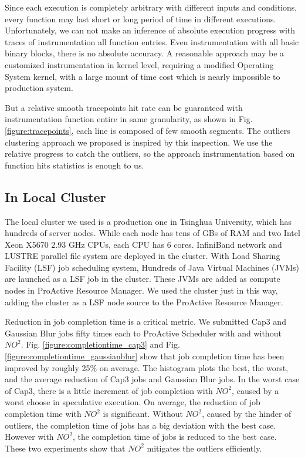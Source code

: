 Since each execution is completely arbitrary with different inputs and conditions, every
function may last short or long period of time in different executions. Unfortunately, we can
not make an inference of absolute execution progress with traces of instrumentation all
function entries. Even instrumentation with all basic binary blocks, there is no absolute
accuracy. A reasonable approach may be a customized instrumentation in kernel level,
requiring a modified Operating System kernel, with a large mount of time cost which is
nearly impossible to production system.

But a relative smooth tracepoints hit rate can be guaranteed with instrumentation function
entire in same granularity, as shown in Fig. \ref{figure:tracepoints}, each line is
composed of few smooth segments. The outliers clustering approach we proposed is inspired
by this inspection. We use the relative progress to catch the outliers, so the approach
instrumentation based on function hits statistics is enough to us.

\subsection{In Local Cluster}

The local cluster we used is a production one in Tsinghua University, which has hundreds
of  server nodes. While each node has tens of GBs of RAM and two Intel Xeon X5670 2.93 GHz
CPUs, each CPU has 6 cores. InfiniBand network and LUSTRE parallel file system are
deployed in the cluster. With Load Sharing Facility (LSF) job scheduling system, Hundreds
of Java Virtual Machines (JVMs) are launched as a LSF job in the cluster. These JVMs are
added as compute nodes in ProActive Resource Manager. We used the cluster just in this
way, adding the cluster as a LSF node source to the ProActive Resource Manager.

Reduction in job completion time is a critical metric. We submitted Cap3 and Gaussian Blur
jobs fifty times each to ProActive Scheduler with and without $NO^2$. Fig.
\ref{figure:completiontime_cap3} and Fig. \ref{figure:completiontime_gaussianblur} show
that job completion time has been improved by roughly 25\% on average. The histogram plots
the best, the worst, and the average reduction of Cap3 jobs and Gaussian Blur jobs. In the worst case
of Cap3, there is a little increment of job completion with $NO^2$, caused by a worst
choose in speculative execution. On average, the reduction of job completion time with
$NO^2$ is significant. Without $NO^2$, caused by the hinder of outliers, the completion
time of jobs has a big deviation with the best case. However with $NO^2$, the completion
time of jobs is reduced to the best case. These two experiments show that $NO^2$
mitigates the outliers efficiently.

